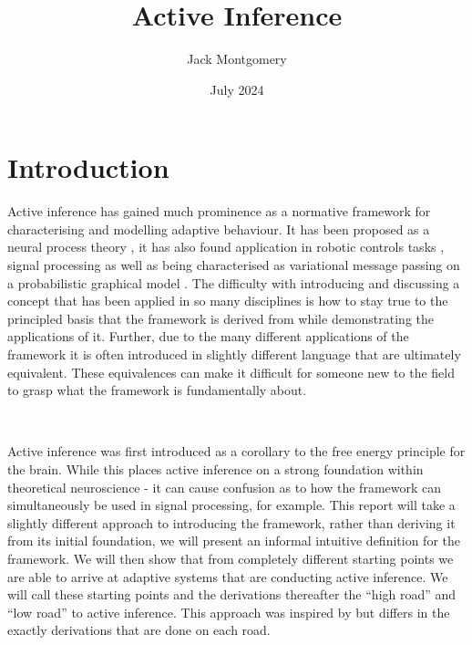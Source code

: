 \documentclass{article}
\title{Active Inference}
\author{Jack Montgomery}
\date{July 2024}
\begin{document}
\maketitle

\newpage

\tableofcontents

\newpage

\section{Introduction}

Active inference has gained much prominence as a normative framework for characterising and modelling adaptive behaviour. It has been proposed as a neural process theory \citep{friston2017active}, it has also found application in robotic controls tasks \citep{lanillos2021active}, signal processing \citep{podusenko2022aida} as well as being characterised as variational message passing on a probabilistic graphical model \citep{champion2021realizing}. The difficulty with introducing and discussing a concept that has been applied in so many disciplines is how to stay true to the principled basis that the framework is derived from while demonstrating the applications of it. Further, due to the many different applications of the framework it is often introduced in slightly different language that are ultimately equivalent. These equivalences can make it difficult for someone new to the field to grasp what the framework is fundamentally about. 

\

Active inference was first introduced as a corollary to the free energy principle for the brain. \citep{friston2006free} While this places active inference on a strong foundation within theoretical neuroscience - it can cause confusion as to how the framework can simultaneously be used in signal processing, for example. This report will take a slightly different approach to introducing the framework, rather than deriving it from its initial foundation, we will present an informal intuitive definition for the framework. We will then show that from completely different starting points we are able to arrive at adaptive systems that are conducting active inference. We will call these starting points and the derivations thereafter the ``high road'' and ``low road'' to active inference. This approach was inspired by \citet{parr2022ActiveInference} but differs in the exactly derivations that are done on each road. 

\
\end{document}
